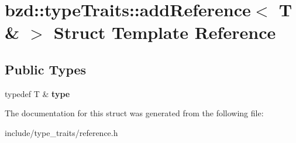 \hypertarget{structbzd_1_1typeTraits_1_1addReference_3_01T_01_6_01_4}{}\section{bzd\+:\+:type\+Traits\+:\+:add\+Reference$<$ T \& $>$ Struct Template Reference}
\label{structbzd_1_1typeTraits_1_1addReference_3_01T_01_6_01_4}
\subsection*{Public Types}
\begin{DoxyCompactItemize}
\item 
\mbox{\label{structbzd_1_1typeTraits_1_1addReference_3_01T_01_6_01_4_a905850f2a158482bbde8085575aed492}} 
typedef T \& {\bfseries type}
\end{DoxyCompactItemize}


The documentation for this struct was generated from the following file\+:\begin{DoxyCompactItemize}
\item 
include/type\+\_\+traits/reference.\+h\end{DoxyCompactItemize}
